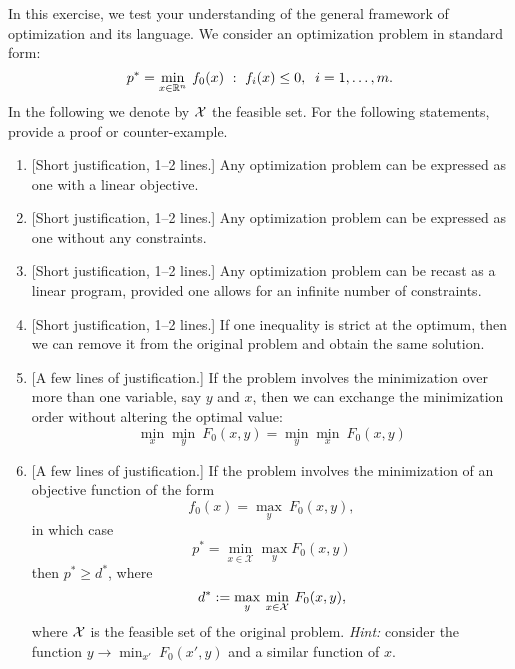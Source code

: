 
In this exercise, we test your understanding of the general framework of optimization and its language. We consider an optimization problem in standard form: 
\[
p^* = \min_{x \in \mathbb{R}^{n}} \: f_0(x) ~:~ f_i(x) \le 0, \;\; i=1,\ldots,m.
\]
In the following we denote by ${\cal X}$ the feasible set. For the following statements, provide a proof or counter-example.

	
\begin{enumerate}
\item 
{[Short justification, 1--2 lines.]} Any optimization problem can be expressed as one with a linear objective. 

\sol{}
\item 
{[Short justification, 1--2 lines.]} Any optimization problem can be expressed as one without any constraints. 

\sol{}
\item 
{[Short justification, 1--2 lines.]} Any optimization problem can be recast as a linear program, provided one allows for an infinite number of constraints. 

\sol{}
\item 
{[Short justification, 1--2 lines.]} If one inequality is strict at the optimum, then we can remove it from the original problem and obtain the same solution. 

\sol{}
\item 
{[A few lines of justification.]} If the problem involves the minimization over more than one variable, say $y$ and $x$, then we can exchange the minimization order without altering the optimal value:
		\[
		\min_x\min_y \: F_0(x,y) = \min_y\min_x \: F_0(x,y)
		\]


\sol{}
\item 
{[A few lines of justification.]} If the problem involves the minimization of an objective function of the form
		\[
		f_0(x) = \max_y \: F_0(x,y),
		\]
        in which case
        \[ p^* = \min_{x \in \mathcal{X}} \max_y F_0(x, y)\]
		then $p^* \ge d^*$, where
		\[
		d^* := \max_y \: \min_{x \in {\cal X}} \: F_0(x,y),
		\]
		where ${\cal X}$ is the feasible set of the original problem. {\em Hint:} consider the function $y \rightarrow \min_{x'} \: F_0(x',y)$ and a similar function of $x$.

\sol{}
\end{enumerate}